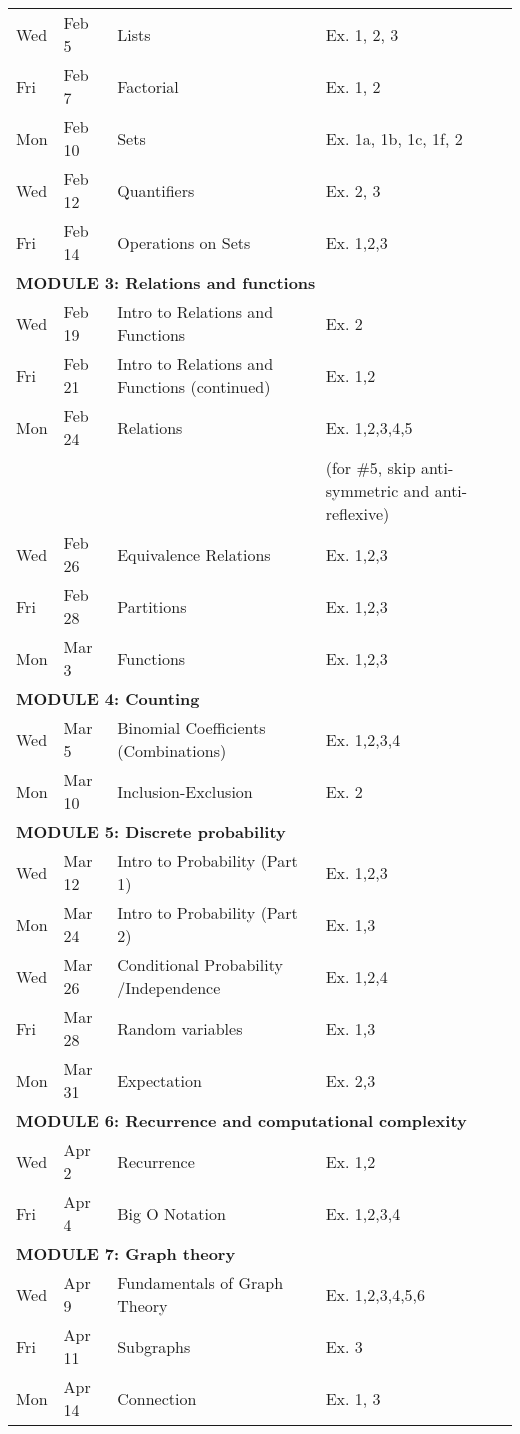 \documentclass[letterpaper]{inzane_syllabus} %
\begin{document}
\begin{center}
\begin{tabularx}{\textwidth}{p{2cm}p{2cm}p{8cm}p{9.5cm}}
Wed &  Feb 5 & Lists & Ex. 1, 2, 3 \\
Fri &  Feb 7 & Factorial & Ex.  1, 2\\
Mon &  Feb 10 & Sets &  Ex. 1a, 1b, 1c, 1f, 2  \\
Wed &  Feb 12 & Quantifiers & Ex. 2, 3 \\
Fri &  Feb 14 & Operations on Sets & Ex. 1,2,3 \\
\hline
\multicolumn{4}{l}{\textbf{\textcolor{myCOLOR}{\large MODULE 3: Relations and functions }}} \\
\hline
Wed &  Feb 19 & Intro to Relations and Functions & Ex. 2 \\
Fri &  Feb 21  & Intro to Relations and Functions (continued) & Ex. 1,2 \\
Mon &  Feb 24 & Relations & Ex. 1,2,3,4,5 \\
 &  & & (for \#5, skip anti-symmetric and anti-reflexive)\\
Wed &  Feb 26 & Equivalence Relations & Ex. 1,2,3 \\
Fri &  Feb 28 & Partitions & Ex. 1,2,3 \\
Mon &  Mar 3 & Functions & Ex. 1,2,3 \\
\hline
\multicolumn{4}{l}{\textbf{\textcolor{myCOLOR}{\large MODULE 4: Counting}}} \\
\hline
Wed &  Mar 5  & Binomial Coefficients (Combinations) & Ex. 1,2,3,4  \\
Mon &  Mar 10  & Inclusion-Exclusion & Ex. 2\\
\hline
\multicolumn{4}{l}{\textbf{\textcolor{myCOLOR}{\large MODULE 5: Discrete probability}}} \\
\hline
Wed &  Mar 12 & Intro to Probability (Part 1) & Ex. 1,2,3 \\ 
Mon &  Mar 24 &  Intro to Probability  (Part 2) & Ex. 1,3 \\
Wed &  Mar 26 & Conditional Probability /Independence & Ex. 1,2,4 \\
Fri & Mar 28  &  Random variables &  Ex. 1,3  \\
Mon &  Mar 31 & Expectation & Ex. 2,3 \\
\hline
\multicolumn{4}{l}{\textbf{\textcolor{myCOLOR}{\large MODULE 6: Recurrence and computational complexity}}} \\
\hline
Wed &  Apr 2 & Recurrence  & Ex. 1,2 \\
Fri &  Apr 4  & Big O Notation & Ex. 1,2,3,4  \\
\hline
\multicolumn{4}{l}{\textbf{\textcolor{myCOLOR}{\large MODULE 7: Graph theory}}} \\
\hline
Wed &  Apr 9 & Fundamentals of Graph Theory & Ex. 1,2,3,4,5,6\\
Fri &  Apr 11 & Subgraphs & Ex. 3 \\ 
Mon &  Apr 14  & Connection & Ex. 1, 3\\ 
\hline
\hline 
\end{tabularx}
\end{center}
\end{document}
